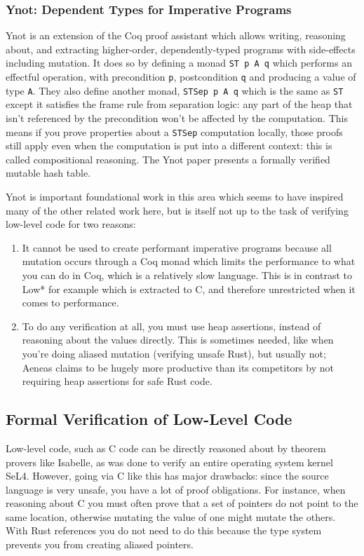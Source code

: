 \documentclass[12pt,twoside]{report}
\begin{document}
\subsubsection{Ynot: Dependent Types for Imperative Programs}
Ynot\citep{nanevski_ynot_2008} is an extension of the Coq proof assistant which allows writing, reasoning about, and extracting higher-order, dependently-typed programs with side-effects including mutation. It does so by defining a monad \verb|ST p A q| which performs an effectful operation, with precondition \verb|p|, postcondition \verb|q| and producing a value of type \verb|A|. They also define another monad, \verb|STSep p A q| which is the same as \verb|ST| except it satisfies the frame rule from separation logic: any part of the heap that isn't referenced by the precondition won't be affected by the computation. This means if you prove properties about a \verb|STSep| computation locally, those proofs still apply even when the computation is put into a different context: this is called compositional reasoning. The Ynot paper presents a formally verified mutable hash table.

Ynot is important foundational work in this area which seems to have inspired many of the other related work here, but is itself not up to the task of verifying low-level code for two reasons:

\begin{enumerate}
  \item It cannot be used to create performant imperative programs because all mutation occurs through a Coq monad which limits the performance to what you can do in Coq, which is a relatively slow language. This is in contrast to Low*\citep{protzenko_low_2017} for example which is extracted to C, and therefore unrestricted when it comes to performance.
  \item To do any verification at all, you must use heap assertions, instead of reasoning about the values directly. This is sometimes needed, like when you're doing aliased mutation (verifying unsafe Rust), but usually not; Aeneas\citep{aeneas} claims to be hugely more productive than its competitors by not requiring heap assertions for safe Rust code.
\end{enumerate}

\subsection{Formal Verification of Low-Level Code}
Low-level code, such as C code can be directly reasoned about by theorem provers like Isabelle, as was done to verify an entire operating system kernel SeL4\citep{klein_sel4_2009}. However, going via C like this has major drawbacks: since the source language is very unsafe, you have a lot of proof obligations. For instance, when reasoning about C you must often prove that a set of pointers do not point to the same location, otherwise mutating the value of one might mutate the others. With Rust references you do not need to do this because the type system prevents you from creating aliased pointers.
\end{document}
